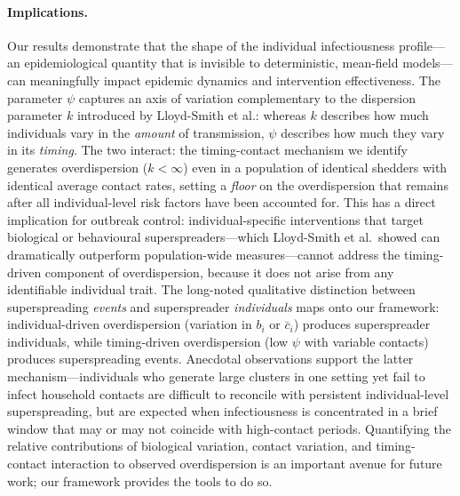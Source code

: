 \paragraph{Implications.}
Our results demonstrate that the shape of the individual infectiousness profile---an epidemiological quantity that is invisible to deterministic, mean-field models---can meaningfully impact epidemic dynamics and intervention effectiveness. The parameter $\psi$ captures an axis of variation complementary to the dispersion parameter $k$ introduced by Lloyd-Smith et al.\citep{lloyd-smith_superspreading_2005}: whereas $k$ describes how much individuals vary in the \textit{amount} of transmission, $\psi$ describes how much they vary in its \textit{timing}. The two interact: the timing-contact mechanism we identify generates overdispersion ($k < \infty$) even in a population of identical shedders with identical average contact rates, setting a \textit{floor} on the overdispersion that remains after all individual-level risk factors have been accounted for. This has a direct implication for outbreak control: individual-specific interventions that target biological or behavioural superspreaders---which Lloyd-Smith et al.\ showed can dramatically outperform population-wide measures---cannot address the timing-driven component of overdispersion, because it does not arise from any identifiable individual trait. The long-noted qualitative distinction between superspreading \textit{events} and superspreader \textit{individuals}\citep{lloyd-smith_superspreading_2005} maps onto our framework: individual-driven overdispersion (variation in $b_i$ or $\bar{c}_i$) produces superspreader individuals, while timing-driven overdispersion (low $\psi$ with variable contacts) produces superspreading events. Anecdotal observations support the latter mechanism---individuals who generate large clusters in one setting yet fail to infect household contacts are difficult to reconcile with persistent individual-level superspreading, but are expected when infectiousness is concentrated in a brief window that may or may not coincide with high-contact periods. Quantifying the relative contributions of biological variation, contact variation, and timing-contact interaction to observed overdispersion is an important avenue for future work; our framework provides the tools to do so.

